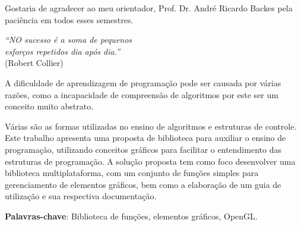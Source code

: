 \documentclass[12pt, %
openright,
oneside, %
a4paper,    %
brazil]{facom-ufu-abntex2}
\begin{document}




\begin{agradecimentos}
Gostaria de agradecer ao meu orientador, Prof. Dr. André Ricardo Backes pela paciência em todos esses semestres. %
\end{agradecimentos}

\begin{epigrafe}
    \vspace*{\fill}
	\begin{flushright}
        \textit{``NO sucesso é a soma de pequenos }\\
        \textit{esforços repetidos dia após dia.''}\\
        (Robert Collier)
	\end{flushright}
\end{epigrafe}


\begin{resumo} %
 A dificuldade de aprendizagem de programação pode ser causada por várias razões, como a incapacidade de compreensão de algoritmos por este ser um conceito muito abstrato.
 
 Várias são as formas utilizadas no ensino de algoritmos e estruturas de controle. Este trabalho apresenta uma proposta de biblioteca para auxiliar o ensino de programação, utilizando conceitos gráficos para facilitar o entendimento das estruturas de programação. A solução proposta tem como foco desenvolver uma biblioteca multiplataforma, com um conjunto de funções simples para gerenciamento de elementos gráficos, bem como a elaboração de um guia de utilização e sua respectiva documentação.

 \vspace{\onelineskip}

 \noindent
 \textbf{Palavras-chave}: Biblioteca de funções, elementos gráficos, OpenGL. %
\end{resumo}
\end{document}
